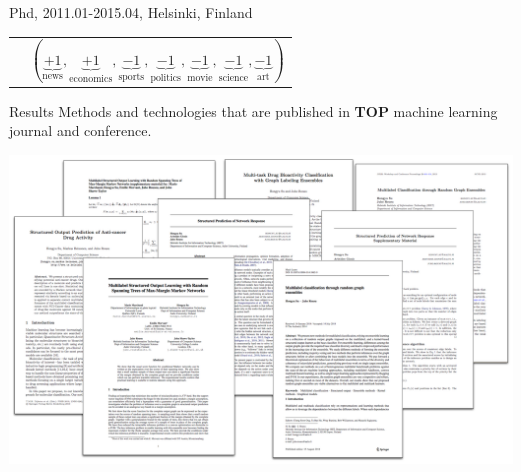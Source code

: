 \documentclass[first=dgreen,second=purple,logo=yellowexc]{aaltoslides}
\begin{document}
\begin{frame}{Phd, 2011.01-2015.04, Helsinki, Finland}
\begin{itemize}
\begin{itemize}
\begin{tabular}{p{3cm}p{10cm}}
			& $(\underbrace{+1}_{\text{news}},\underbrace{+1}_{\text{economics}},\underbrace{-1}_{\text{sports}},\underbrace{-1}_{\text{politics}},\underbrace{-1}_{\text{movie}},\underbrace{-1}_{\text{science}},\underbrace{-1}_{\text{art}})$\\
	        \end{tabular}
		\end{itemize}
	\end{itemize}
\end{frame}

\begin{frame}{Results}
	Methods and technologies that are published in {\bf TOP} machine learning journal and conference.
	\begin{center}
		\includegraphics[scale=0.15]{./plots/paperCollection.pdf}
	\end{center}
\end{frame}
\end{document}
